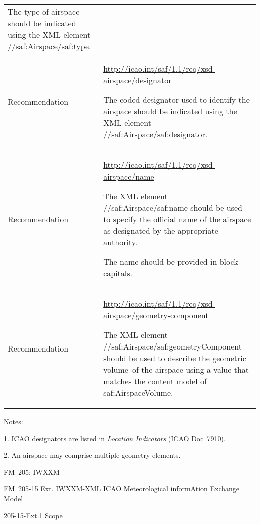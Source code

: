 \begin{longtable}[]{@{}ll@{}}
\begin{minipage}[t]{0.47\columnwidth}
The type of airspace should be indicated using the XML element //saf:Airspace/saf:type.\strut
\end{minipage}\tabularnewline
\begin{minipage}[t]{0.47\columnwidth}\raggedright
Recommendation\strut
\end{minipage} & \begin{minipage}[t]{0.47\columnwidth}\raggedright
\url{http://icao.int/saf/1.1/req/xsd-airspace/designator}

The coded designator used to identify the airspace should be indicated using the XML element //saf:Airspace/saf:designator.\strut
\end{minipage}\tabularnewline
\begin{minipage}[t]{0.47\columnwidth}\raggedright
Recommendation\strut
\end{minipage} & \begin{minipage}[t]{0.47\columnwidth}\raggedright
\url{http://icao.int/saf/1.1/req/xsd-airspace/name}

The XML element //saf:Airspace/saf:name should be used to specify the official name of the airspace as designated by the appropriate authority.

The name should be provided in block capitals.\strut
\end{minipage}\tabularnewline
\begin{minipage}[t]{0.47\columnwidth}\raggedright
Recommendation\strut
\end{minipage} & \begin{minipage}[t]{0.47\columnwidth}\raggedright
\url{http://icao.int/saf/1.1/req/xsd-airspace/geometry-component}

The XML element //saf:Airspace/saf:geometryComponent should be used to describe the geometric volume~of the airspace using a value that matches the content model of saf:AirspaceVolume.\strut
\end{minipage}\tabularnewline
\bottomrule
\end{longtable}

Notes:

1. ICAO designators are listed in \emph{Location Indicators} (ICAO Doc~7910).

2. An airspace may comprise multiple geometry elements.

FM~205: IWXXM

FM~205-15 Ext. IWXXM-XML ICAO Meteorological informAtion Exchange Model

205-15-Ext.1 Scope

